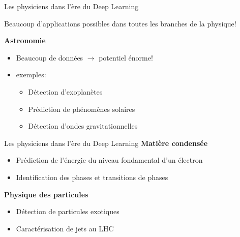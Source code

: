 \documentclass[french]{beamer}
\begin{document}
\begin{frame}{Les physiciens dans l'ère du Deep Learning}
\begin{center}
Beaucoup d'applications possibles dans toutes les branches de la physique!
\end{center}
\textbf{Astronomie}
\vspace{.5cm}
\begin{itemize}
	\item Beaucoup de données $\rightarrow$ potentiel énorme!
	\item exemples:
	\begin{itemize}
		\item Détection d'exoplanètes \cite{2017DPS....4942102P}
		\item Prédiction de phénomènes solaires \cite{McGregor2017}
		\item Détection d'ondes gravitationnelles \cite{George:2017pmj}
	\end{itemize} 
\end{itemize}
\end{frame}

\begin{frame}{Les physiciens dans l'ère du Deep Learning}
\textbf{Matière condensée}
\vspace{.5cm}
\begin{itemize}
	\item Prédiction de l'énergie du niveau fondamental d'un électron \cite{2017arXiv170201361M}
	\item Identification des phases et transitions de phases \cite{carrasquilla2017machine}
\end{itemize}
\vspace{.5cm}
\textbf{Physique des particules}
\vspace{.5cm}
\begin{itemize}
	\item Détection de particules exotiques \cite{2014NatCo...5E4308B}
	\item Caractérisation de jets au LHC \cite{2017arXiv170200748L}
\end{itemize}
\end{frame}
\end{document}
